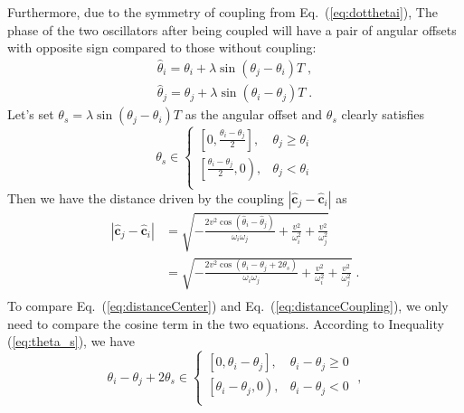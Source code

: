\documentclass[%
 aip,
 amsmath,amssymb,
 reprint,%
]{revtex4-1}
\begin{document}
Furthermore, due to the symmetry of coupling from Eq.~(\ref{eq:dotthetai}), The phase of the two oscillators after being coupled will have a pair of angular offsets with opposite sign compared to those without coupling:
\begin{equation}
    \begin{array}{c}
        \hat{\theta}_i=\theta _i+\lambda \sin \left( \theta _j-\theta _i \right) T\;,\\
        \hat{\theta}_j=\theta _j+\lambda \sin \left( \theta _i-\theta _j \right) T\;.
    \end{array}
\end{equation}
Let's set $\theta _s=\lambda \sin \left( \theta _j-\theta _i \right) T$ as the angular offset and $\theta _s$ clearly satisfies
\begin{equation}\label{eq:theta_s}
    \theta _s\in \begin{cases}
        \left[ 0, \frac{\theta _i-\theta _j}{2} \right] ,&		\theta _j\geqslant \theta _i\\
        \left[ \frac{\theta _i-\theta _j}{2}, 0 \right) ,&		\theta _j<\theta _i\\
    \end{cases}
\end{equation}
Then we have the distance driven by the coupling $\left| \hat{\mathbf{c}}_j-\hat{\mathbf{c}}_i \right|$ as
\begin{equation}
    \begin{aligned}\label{eq:distanceCoupling}
        \left| \hat{\mathbf{c}}_j-\hat{\mathbf{c}}_i \right|&=\sqrt{-\frac{2v^2\cos \left( \hat{\theta}_i-\hat{\theta}_j \right)}{\omega _i\omega _j}+\frac{v^2}{\omega _{i}^{2}}+\frac{v^2}{\omega _{j}^{2}}}\\
        &=\sqrt{-\frac{2v^2\cos \left( \theta _i-\theta _j+2\theta _s \right)}{\omega _i\omega _j}+\frac{v^2}{\omega _{i}^{2}}+\frac{v^2}{\omega _{j}^{2}}}\;.\\
    \end{aligned}
\end{equation}
To compare Eq.~(\ref{eq:distanceCenter}) and Eq.~(\ref{eq:distanceCoupling}), we only need to compare the cosine term in the two equations. According to Inequality (\ref{eq:theta_s}), we have
\begin{equation}
    \theta _i-\theta _j+2\theta _s\in \begin{cases}
        \left[ 0, \theta _i-\theta _j \right] ,&		\theta _i-\theta _j\geqslant 0\\
        \left[ \theta _i-\theta _j, 0 \right) ,&		\theta _i-\theta _j<0\\
    \end{cases}\;,
\end{equation}
\end{document}
